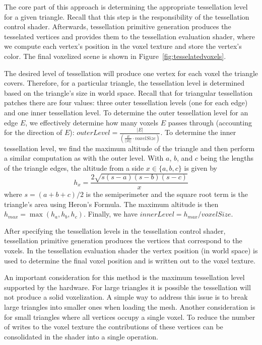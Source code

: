 The core part of this approach is determining the appropriate tessellation level for a given triangle. Recall that this step is the responsibility of the tessellation control shader. Afterwards, tessellation primitive generation produces the tesselated vertices and provides them to the tessellation evaluation shader, where we compute each vertex's position in the voxel texture and store the vertex's color. The final voxelized scene is shown in Figure~\ref{fig:tesselatedvoxels}.

The desired level of tessellation will produce one vertex for each voxel the triangle covers. Therefore, for a particular triangle, the tessellation level is determined based on the triangle's size in world space. Recall that for triangular tessellation patches there are four values: three outer tessellation levels (one for each edge) and one inner tessellation level. To determine the outer tessellation level for an edge $E$, we effectively determine how many voxels $E$ passes through (accounting for the direction of $E$): $\displaystyle outerLevel = \frac{|E|}{(\frac{E}{||E||} \cdot voxelSize)}$. To determine the inner tessellation level, we find the maximum altitude of the triangle and then perform a similar computation as with the outer level. With $a$, $b$, and $c$ being the lengths of the triangle edges, the altitude from a side $x \in \{a, b, c\}$ is given by
\[
    h_x = \frac{2 \sqrt{s(s-a)(s-b)(s-c)}}{x}
\]
where $s = (a + b + c) / 2$ is the semiperimeter and the square root term is the triangle's area using Heron's Formula. The maximum altitude is then $h_{max} = \max(h_a, h_b, h_c)$. Finally, we have $innerLevel = h_{max} / voxelSize$. %

After specifying the tessellation levels in the tessellation control shader, tessellation primitive generation produces the vertices that correspond to the voxels. In the tessellation evaluation shader the vertex position (in world space) is used to determine the final voxel position and is written out to the voxel texture.

An important consideration for this method is the maximum tessellation level supported by the hardware. For large triangles it is possible the tessellation will not produce a solid voxelization. A simple way to address this issue is to break large triangles into smaller ones when loading the mesh. Another consideration is for small triangles where all vertices occupy a single voxel. To reduce the number of writes to the voxel texture the contributions of these vertices can be consolidated in the shader into a single operation.

